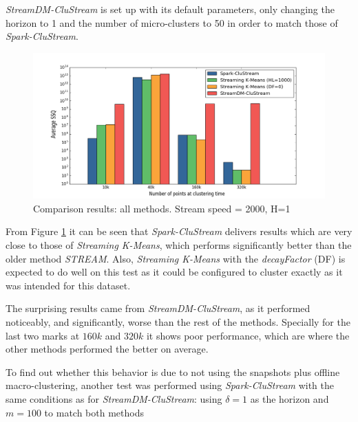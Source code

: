 \textit{StreamDM-CluStream} is set up with its default parameters, only changing the horizon to 1 and the number of micro-clusters to 50 in order to match those of \textit{Spark-CluStream}.

\begin{figure}[h]
 \centering
 \includegraphics[scale=0.4]{./styles/comparison2000.png}
 \caption{Comparison results: all methods. Stream speed = 2000, H=1}
 \label{fig:comparison2000}
\end{figure}

From Figure \ref{fig:comparison2000} it can be seen that \textit{Spark-CluStream} delivers results which are very close to those of \textit{Streaming K-Means}, which performs significantly better than the older method \textit{STREAM}. Also, \textit{Streaming K-Means} with the \textit{decayFactor} (DF) is expected to do well on this test as it could be configured to cluster exactly as it was intended for this dataset. 

The surprising results came from \textit{StreamDM-CluStream}, as it performed noticeably, and significantly, worse than the rest of the methods. Specially for the last two marks at $160k$ and $320k$ it shows poor performance, which are where the other methods performed the better on average.

To find out whether this behavior is due to not using the snapshots plus offline macro-clustering, another test was performed using \textit{Spark-CluStream} with the same conditions as for \textit{StreamDM-CluStream}: using $\delta = 1$ as the horizon and $m=100$ to match both methods

